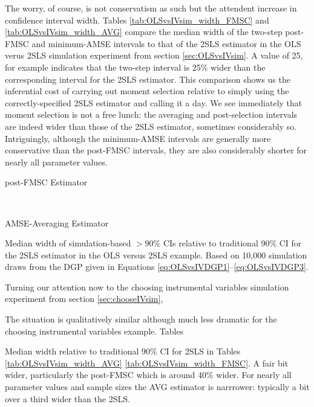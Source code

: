 The worry, of course, is not conservatism as such but the attendent increase in confidence interval width.
Tables \ref{tab:OLSvsIVsim_width_FMSC} and \ref{tab:OLSvsIVsim_width_AVG} compare the median width of the two-step post-FMSC and minimum-AMSE intervals to that of the 2SLS estimator in the OLS verus 2SLS simulation experiment from section \ref{sec:OLSvsIVsim}.
A value of 25, for example indicates that the two-step interval is 25\% wider than the corresponding interval for the 2SLS estimator.
This comparison shows us the inferential cost of carrying out moment selection relative to simply using the correctly-specified 2SLS estimator and calling it a day.
We see immediately that moment selection is not a free lunch: the averaging and post-selection intervals are indeed wider than those of the 2SLS estimator, sometimes considerably so.
Intriguingly, although the minimum-AMSE intervals are generally more conservative than the post-FMSC intervals, they are also considerably shorter for nearly all parameter values.
\begin{table}[h]
\footnotesize
\centering
	\begin{subtable}{0.48\textwidth}
		\caption{post-FMSC Estimator}
		
		\label{tab:OLSvsIVsim_width_FMSC}
	\end{subtable}	
	~
	\begin{subtable}{0.48\textwidth}
		\caption{AMSE-Averaging Estimator}
		
		\label{tab:OLSvsIVsim_width_AVG}
	\end{subtable}
	\caption{Median width of simulation-based $>90\%$ CIs relative to traditional 90\% CI for the 2SLS estimator in the OLS versus 2SLS example. Based on 10,000 simulation draws from the DGP given in Equations \ref{eq:OLSvsIVDGP1}--\ref{eq:OLSvsIVDGP3}.}
\end{table}

Turning our attention now to the choosing instrumental variables simulation experiment from section \ref{sec:chooseIVsim}, 




The situation is qualitatively similar although much less dramatic for the choosing instrumental variables example.
Tables 

Median width relative to traditional 90\% CI for 2SLS in Tables \ref{tab:OLSvsIVsim_width_AVG} \ref{tab:OLSvsIVsim_width_FMSC}.
A fair bit wider, particularly the post-FMSC which is around 40\% wider.
For nearly all parameter values and sample sizes the AVG estimator is narrrower: typically a bit over a third wider than the 2SLS.

